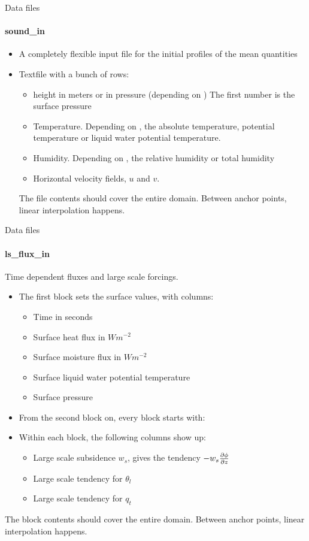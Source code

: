 \begin{frame}{Data files}
\framesubtitle{sound\_in}
\begin{itemize}
 \item A completely flexible input file for the initial profiles of the mean quantities
 \item Textfile with a bunch of rows:
\begin{itemize}
 \item height in meters or in pressure (depending on ) The first number is the surface pressure
 \item Temperature. Depending on , the absolute temperature, potential temperature or liquid water potential temperature. 
 \item Humidity. Depending on , the relative humidity or total humidity
 \item Horizontal velocity fields, $u$ and $v$.
\end{itemize}
The file contents should cover the entire domain. Between anchor points, linear interpolation happens.
\end{itemize}
\end{frame}

\begin{frame}{Data files}
\framesubtitle{ls\_flux\_in} 
Time dependent fluxes and large scale forcings. 
\begin{itemize}
 \item The first block sets the surface values, with columns:
\begin{itemize}
 \item Time in seconds
 \item 	Surface heat flux in $W m^{-2}$
 \item 	Surface moisture flux in $W m^{-2}$
 \item Surface liquid water potential temperature
 \item Surface pressure
\end{itemize}
 \item From the  second block on, every block starts with: 
 \item Within each block, the following columns show up:
 \begin{itemize}
   \item Large scale subsidence $w_s$, gives the tendency $-w_s\frac{\partial \phi}{\partial z}$
   \item Large scale tendency for $\theta_l$
   \item Large scale tendency for $q_t$
  \end{itemize}
\end{itemize}
The block contents should cover the entire domain. Between anchor points, linear interpolation happens.
\end{frame}
 
